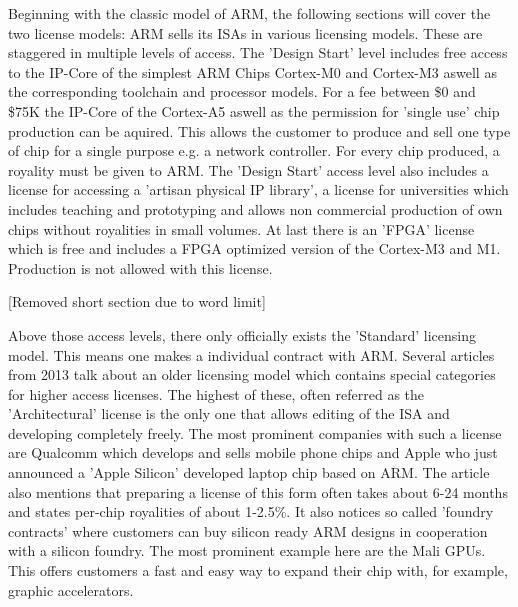 \documentclass[conference]{IEEEtran}
\begin{document}
	Beginning with the classic model of ARM, the following sections will cover the two license models: ARM sells its \glspl{ISA} in various licensing models. \cite{ARMLC} These are staggered in multiple levels of access. The 'Design Start' level includes free access to the IP-Core of the simplest ARM Chips Cortex-M0 and Cortex-M3 aswell as the corresponding toolchain and processor models. For a fee between \$0 and \$75K the IP-Core of the Cortex-A5 aswell as the permission for 'single use' chip production can be aquired. This allows the customer to produce and sell one type of chip for a single purpose e.g. a network controller. For every chip produced, a royality must be given to ARM. The 'Design Start' access level also includes a license for accessing a 'artisan physical IP library', a license for universities which includes teaching and prototyping and allows non commercial production of own chips without royalities in small volumes. At last there is an '\acrshort{FPGA}' license which is free and includes a \gls{FPGA} optimized version of the Cortex-M3 and M1. Production is not allowed with this license.

	[Removed short section due to word limit]

	Above those access levels, there only officially exists the 'Standard' licensing model. This means one makes a individual contract with ARM.
	Several articles from 2013 \cite{Demerjian2013}\cite{Demerjian2013a} talk about an older licensing model which contains special categories for higher access licenses. The highest of these, often referred as the 'Architectural' license is the only one that allows editing of the \gls{ISA} and developing completely freely. The most prominent companies with such a license are Qualcomm which develops and sells mobile phone chips and Apple who just announced a 'Apple Silicon' developed laptop chip based on ARM. \cite{Apple2020} The article also mentions that preparing a license of this form often takes about 6-24 months and states per-chip royalities of about 1-2.5\%. It also notices so called 'foundry contracts' where customers can buy silicon ready ARM designs in cooperation with a silicon foundry. The most prominent example here are the Mali GPUs. This offers customers a fast and easy way to expand their chip with, for example, graphic accelerators.
\end{document}
